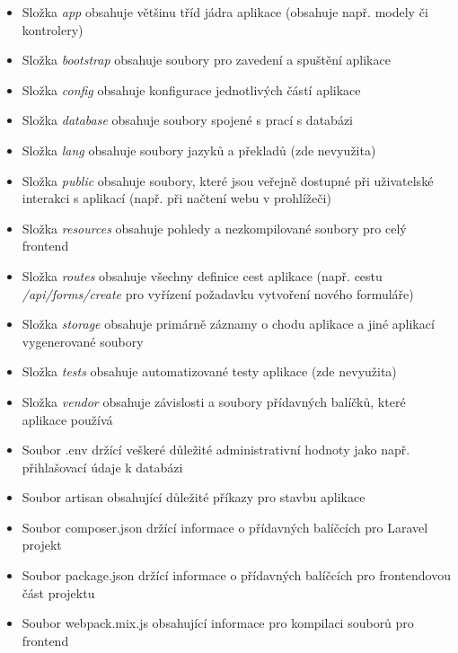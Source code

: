 	\begin{itemize}
		\item Složka \textit{app} obsahuje většinu tříd jádra aplikace (obsahuje např. modely či kontrolery) \cite{LaravelDir}
		\item Složka \textit{bootstrap} obsahuje soubory pro zavedení a spuštění aplikace \cite{LaravelDir}
		\item Složka \textit{config} obsahuje konfigurace jednotlivých částí aplikace \cite{LaravelDir}
		\item Složka \textit{database} obsahuje soubory spojené s prací s databázi \cite{LaravelDir}
		\item Složka \textit{lang} obsahuje soubory jazyků a překladů (zde nevyužita) \cite{LaravelDir}
		\item Složka \textit{public} obsahuje soubory, které jsou veřejně dostupné při uživatelské interakci s aplikací (např. při načtení webu v prohlížeči) \cite{LaravelDir}
		\item Složka \textit{resources} obsahuje pohledy a nezkompilované soubory pro celý frontend \cite{LaravelDir}
		\item Složka \textit{routes} obsahuje všechny definice cest aplikace (např. cestu \textit{/api/forms/create} pro vyřízení požadavku vytvoření nového formuláře) \cite{LaravelDir}
		\item Složka \textit{storage} obsahuje primárně záznamy o chodu aplikace a jiné aplikací vygenerované soubory \cite{LaravelDir}
		\item Složka \textit{tests} obsahuje automatizované testy aplikace (zde nevyužita) \cite{LaravelDir}
		\item Složka \textit{vendor} obsahuje závislosti a soubory přídavných balíčků, které aplikace používá \cite{LaravelDir} 
		\item Soubor .env držící veškeré důležité administrativní hodnoty jako např. přihlašovací údaje k databázi
		\item Soubor artisan obsahující důležité příkazy pro stavbu aplikace \cite{LaravelArtisan} 
		\item Soubor composer.json držící informace o přídavných balíčcích pro Laravel projekt \cite{ComposerpJSON}
		\item Soubor package.json držící informace o přídavných balíčcích pro frontendovou část projektu \cite{NPMpJSON}
		\item Soubor webpack.mix.js obsahující informace pro kompilaci souborů pro frontend \cite{LaravelJSCSS}
	\end{itemize}

